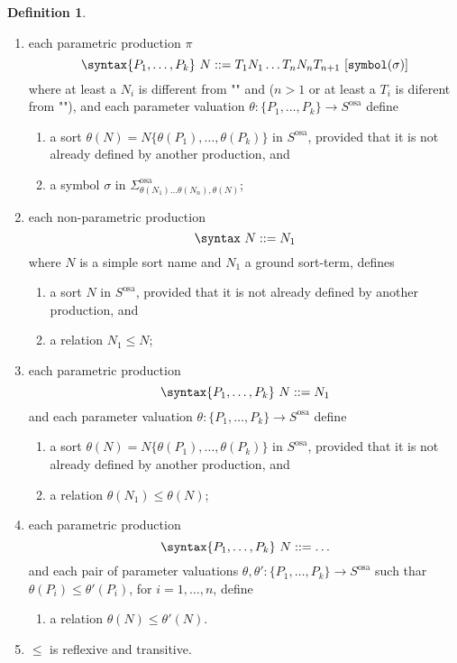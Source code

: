 \documentclass{article}
\theoremstyle{definition}
\theoremstyle{definition}
\theoremstyle{definition}
\newtheorem{definition}{Definition}[section]
\theoremstyle{definition}
\newtheorem{remark}{Remark}[section]
\theoremstyle{theorem}
\theoremstyle{theorem}
\theoremstyle{theorem}
\theoremstyle{theorem}
\theoremstyle{theorem}
\newcommand{\KWsymbol}{\texttt{symbol}}
\begin{document}
{\begin{definition}
\begin{enumerate}
\begin{remark}
\end{remark}
\item each parametric production $\pi$
\[\syntax\{P_1,\ldots,P_k\}\ N ::= T_1 N_1 \ldots T_n N_n T_{n+1}\ [\KWsymbol(\sigma)]\]
where at least a $N_i$ is different from "" and ($n>1$ or at least a $T_i$ is diferent from ""), and each parameter valuation
$\theta : \{P_1,\ldots,P_k\}\to S^\textrm{osa}$ define
\begin{enumerate}
\item a sort $\theta(N)=N\{\theta(P_1),\ldots,\theta(P_k)\}$ in $S^\textrm{osa}$, provided that it is not already defined by another production, and
\item a symbol $\sigma$ in $\Sigma^\textrm{osa}_{\theta(N_1)\ldots\theta(N_n),\theta(N)}$;
\end{enumerate}
\item each non-parametric production
\[\syntax\ N ::= N_1\]
where $N$ is a simple sort name and $N_1$ a ground sort-term, defines
\begin{enumerate}
\item a sort $N$ in $S^\textrm{osa}$, provided that it is not already defined by another production, and
\item a relation $N_1\le N$;
\end{enumerate}
\item each parametric production
\[\syntax\{P_1,\ldots,P_k\}\ N ::= N_1\]
and each parameter valuation $\theta : \{P_1,\ldots,P_k\}\to S^\textrm{osa}$ define
\begin{enumerate}
\item a sort $\theta(N)=N\{\theta(P_1),\ldots,\theta(P_k)\}$ in $S^\textrm{osa}$, provided that it is not already defined by another production, and
\item a relation $\theta(N_1)\le \theta(N)$;
\end{enumerate}
 \item each parametric production
\[\syntax\{P_1,\ldots,P_k\}\ N ::= \ldots\]
and each pair of parameter valuations $\theta,\theta' : \{P_1,\ldots,P_k\}\to S^\textrm{osa}$ such thar $\theta(P_i)\le \theta'(P_i)$, for $i=1,\ldots,n$, define
\begin{enumerate}
\item a relation $\theta(N)\le \theta'(N)$.
\end{enumerate}
\item $\le$ is reflexive and transitive.
\end{enumerate}
\end{definition}

}
\end{document}
